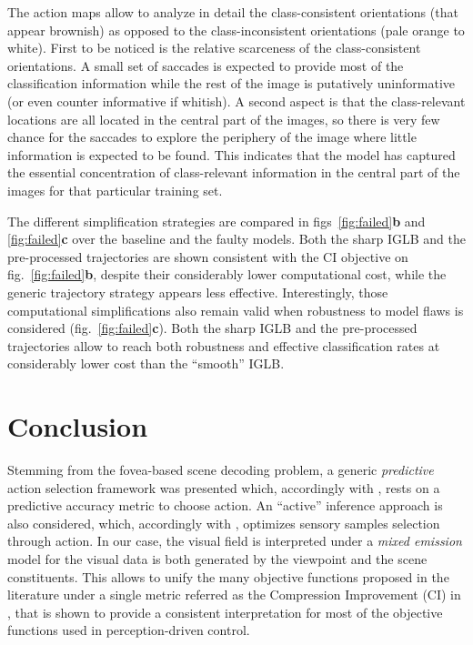 \documentclass[12pt,twoside,openright]{article}
\begin{document}
{\color{Purple} The action maps allow to analyze in detail the class-consistent orientations (that appear brownish) as opposed to the class-inconsistent orientations (pale orange to white). First to be noticed is the relative scarceness of the class-consistent orientations. 
A small set of saccades is expected to provide most of the classification information while the rest of the image is putatively uninformative (or even counter informative if whitish). A second aspect is that the class-relevant locations are all located in the central part of the images, so there is very few chance for the saccades to explore the periphery of the image where little information is expected to be found. This indicates that the model has captured the essential concentration of class-relevant information in the central part of the images for that particular training set.}

The different simplification strategies are compared in figs~\ref{fig:failed}\textbf{b} and \ref{fig:failed}\textbf{c} over the baseline and the faulty models. Both the sharp IGLB and the pre-processed trajectories are shown consistent with the CI objective on fig.~\ref{fig:failed}\textbf{b}, despite their considerably lower computational cost, while the generic trajectory strategy appears less effective. Interestingly, those computational simplifications also remain valid when robustness to model flaws is considered (fig.~\ref{fig:failed}\textbf{c}). 
Both the sharp IGLB and the pre-processed trajectories allow to reach both robustness and effective classification rates at considerably lower cost than the ``smooth'' IGLB.


\section{Conclusion}
{\color{Purple}Stemming from the} fovea-based scene decoding problem, {\color{Purple} a generic \emph{predictive} action selection framework} was presented which, accordingly with \citep{najemnik2005optimal}, rests on a predictive accuracy metric to choose action. An {\color{Purple}``active''} inference approach is also considered, which, accordingly with \citep{friston2012perceptions}, optimizes sensory samples selection through action. In our case, the visual field is interpreted under a \emph{mixed emission} model for the visual data is both generated by the viewpoint and the scene constituents. 
This allows to unify the many objective functions proposed in the literature under a single metric referred as the Compression Improvement (CI) in \citep{schmidhuber2007simple}, that is shown to provide a consistent interpretation for most of the objective functions used in perception-driven control. 
\end{document}
